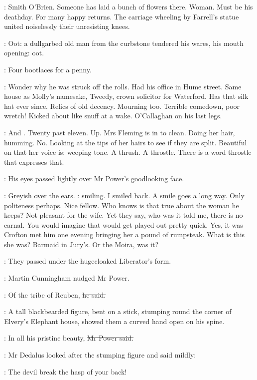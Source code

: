 \BloomInt:
Smith O'Brien.
Someone has laid a bunch of flowers there.
Woman.
Must be his deathday.
For many happy returns.
The carriage wheeling by Farrell's statue
united noiselessly their unresisting knees.

:
Oot:
a dullgarbed old man from the curbstone tendered his wares,
his mouth opening:
oot.

\man:
Four bootlaces for a penny.

\BloomInt:
Wonder why he was struck off the rolls.
Had his office in Hume street.
Same house as Molly's namesake,
Tweedy, crown solicitor for Waterford.
Has that silk hat ever since.
Relics of old decency.
Mourning too.
Terrible comedown, poor wretch!
Kicked about like snuff at a wake.
O'Callaghan on his last legs.

\BloomInt:
And .
Twenty past eleven.
Up.
Mrs Fleming is in to clean.
Doing her hair, humming.
No.
Looking at the tips of her hairs to see if they are split.
Beautiful on that  her voice is:
weeping tone.
A thrush.
A throstle.
There is a word throstle that expresses that.

:
His eyes passed lightly over Mr Power's goodlooking face.

\BloomInt:
Greyish over the ears.
:
smiling.
I smiled back.
A smile goes a long way.
Only politeness perhaps.
Nice fellow.
Who knows is that true about the woman he keeps?
Not pleasant for the wife.
Yet they say,
who was it told me,
there is no carnal.
You would imagine that would get played out pretty quick.
Yes, it was Crofton met him one evening
bringing her a pound of rumpsteak.
What is this she was?
Barmaid in Jury's.
Or the Moira, was it?

:
They passed under the hugecloaked Liberator's form.

:
Martin Cunningham nudged Mr Power.

\cunningham:
Of the tribe of Reuben,
\sout{he said.}

:
A tall blackbearded figure, bent on a stick,
stumping round the corner of Elvery's Elephant house,
showed them a curved hand open on his spine.

\power:
In all his pristine beauty,
\sout{Mr Power said.}

:
Mr Dedalus looked after the stumping figure and said mildly:

\simon:
The devil break the hasp of your back!

